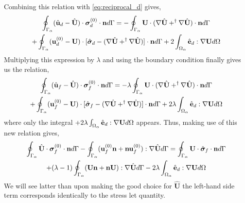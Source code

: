 Combining this relation with \ref{eq:reciprocal_d} gives,
\begin{multline}
    \oint_{\Gamma_{\alpha}} (\hat{\textbf{u}}_d - \hat{\textbf{U}})\cdot \bm\sigma_d^{(0)} \cdot \textbf{n} d\Gamma
    =
    - \oint_{\Gamma_{\alpha}}   \textbf{U} \cdot (\mathbf{\nabla} \hat{\textbf{U}} + ^\dagger\mathbf{\nabla} \hat{\textbf{U}})  \cdot \textbf{n} d\Gamma\\
    + \oint_{\Gamma_{\alpha}} (\textbf{u}_d^{(0)} - \textbf{U}) \cdot  [\hat{\bm\sigma}_d -(\mathbf{\nabla} \hat{\textbf{U}} + ^\dagger\mathbf{\nabla} \hat{\textbf{U}})]\cdot \textbf{n}  d\Gamma
    + 2\int_{\Omega_{\alpha}} \hat{\textbf{e}}_d : \mathbf{\nabla} \textbf{U} d\Omega 
\end{multline}
Multiplying this expression by $\lambda$ and using the boundary condition finally gives us the relation,
\begin{multline}
    \oint_{\Gamma_{\alpha}} (\hat{\textbf{u}}_f - \hat{\textbf{U}})\cdot \bm\sigma_f^{(0)} \cdot \textbf{n} d\Gamma
    =
    - \lambda\oint_{\Gamma_{\alpha}}   \textbf{U} \cdot (\mathbf{\nabla} \hat{\textbf{U}} + ^\dagger\mathbf{\nabla} \hat{\textbf{U}})  \cdot \textbf{n} d\Gamma\\
    + \oint_{\Gamma_{\alpha}} (\textbf{u}_f^{(0)} - \textbf{U}) \cdot  [\hat{\bm\sigma}_f -(\mathbf{\nabla} \hat{\textbf{U}} + ^\dagger\mathbf{\nabla} \hat{\textbf{U}})]\cdot \textbf{n}  d\Gamma
    + 2\lambda\int_{\Omega_{\alpha}} \hat{\textbf{e}}_d : \mathbf{\nabla} \textbf{U} d\Omega 
\end{multline}
where only the integral $+ 2\lambda\int_{\Omega_{\alpha}} \hat{\textbf{e}}_d : \mathbf{\nabla} \textbf{U} d\Omega $ appears. 
Thus, making use of this new relation gives, 
\begin{multline}
    \intS{\hat{\textbf{U}}\cdot  \bm\sigma_f^{(0)} \cdot \textbf{n}}
    - \intS{(\textbf{u}_f^{(0)}\textbf{n}+\textbf{nu}_f^{(0)})  : \grad \hat{\textbf{U}} }
    = 
    \intS{\textbf{U}\cdot  \hat{\bm\sigma}_f \cdot \textbf{n}}\\
    +(\lambda -1) \intS{  (\textbf{U} \textbf{n}+ \textbf{n} \textbf{U}) : \grad \hat{\textbf{U}}  }
    - 2\lambda\intO{\hat{\textbf{e}}_d : \grad \textbf{U}}
    \label{eq:reciprocal_f2}
\end{multline}
We will see latter than upon making the good choice for $\hat{\textbf{U}}$ the left-hand side term corresponds identically to the stress let quantity. 


